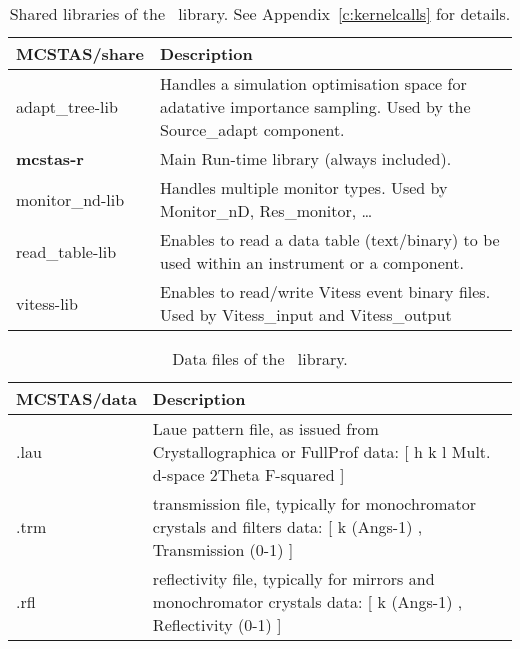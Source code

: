 \begin{table}
  \begin{center}
    {\let\my=\\
    \begin{tabular}{|p{}|p{}|}
      \hline
       MCSTAS/share & Description \\ 
       \hline
       adapt\_tree-lib  & Handles a simulation optimisation space for
       adatative importance sampling.
                          Used by the Source\_adapt component. \\
       {\bf mcstas-r}      &   Main Run-time library (always included). \\
       monitor\_nd-lib & Handles multiple monitor types. 
                        Used by Monitor\_nD, Res\_monitor, \ldots \\
       read\_table-lib  & Enables to read a data table (text/binary) to be used within
                          an instrument or a component. \\
       vitess-lib &     Enables to read/write Vitess event binary files. 
                        Used by Vitess\_input and Vitess\_output \\             
      \hline
    \end{tabular}
    \caption{Shared libraries of the \MCS\ library. See Appendix~\ref{c:kernelcalls} for details.}
    \label{t:comp-share}
    }
  \end{center}
\end{table}

\begin{table}
  \begin{center}
    {\let\my=\\
    \begin{tabular}{|p{}|p{}|}
      \hline
       MCSTAS/data & Description \\ 
       \hline
 .lau & Laue pattern file, as issued from Crystallographica or FullProf
       data: [ h   k   l Mult. d-space 2Theta   F-squared ] \\
 .trm & transmission file, typically for monochromator crystals and filters
       data: [ k (Angs-1) , Transmission (0-1) ] \\
 .rfl & reflectivity file, typically for mirrors and monochromator crystals
       data: [ k (Angs-1) , Reflectivity (0-1) ] \\       
      \hline
    \end{tabular}
    \caption{Data files of the \MCS\ library.}
    \label{t:comp-data}
    }
  \end{center}
\end{table}

